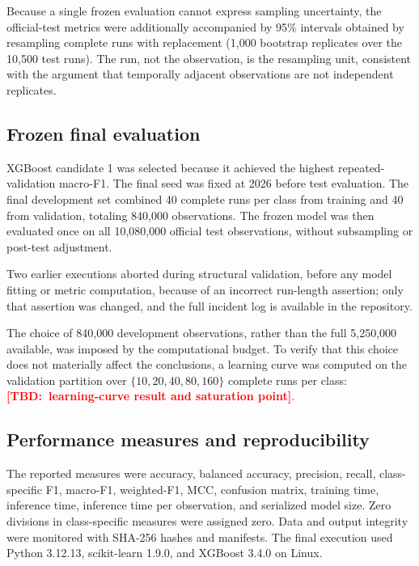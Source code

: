 \documentclass[10pt,twocolumn,a4paper]{article}
\newcommand{\TBD}[1]{\textcolor{red}{\textbf{[TBD:~#1]}}}
\begin{document}
Because a single frozen evaluation cannot express sampling uncertainty, the
official-test metrics were additionally accompanied by 95\% intervals obtained
by resampling complete runs with replacement (1{,}000 bootstrap replicates over
the 10{,}500 test runs). The run, not the observation, is the resampling unit,
consistent with the argument that temporally adjacent observations are not
independent replicates.

\subsection{Frozen final evaluation}

XGBoost candidate 1 was selected because it achieved the highest repeated-
validation macro-F1. The final seed was fixed at 2026 before test evaluation.
The final development set combined 40 complete runs per class from training and
40 from validation, totaling 840,000 observations. The frozen model was then
evaluated once on all 10,080,000 official test observations, without
subsampling or post-test adjustment.

Two earlier executions aborted during structural validation, before any model
fitting or metric computation, because of an incorrect run-length assertion;
only that assertion was changed, and the full incident log is available in the
repository.

The choice of 840,000 development observations, rather than the full 5,250,000
available, was imposed by the computational budget. To verify that this choice
does not materially affect the conclusions, a learning curve was computed on
the validation partition over $\{10,20,40,80,160\}$ complete runs per class:
\TBD{learning-curve result and saturation point}.

\subsection{Performance measures and reproducibility}
\label{sec:reproducibility}

The reported measures were accuracy, balanced accuracy, precision, recall,
class-specific F1, macro-F1, weighted-F1, MCC, confusion matrix, training time,
inference time, inference time per observation, and serialized model size.
Zero divisions in class-specific measures were assigned zero. Data and output
integrity were monitored with SHA-256 hashes and manifests. The final execution
used Python 3.12.13, scikit-learn 1.9.0, and XGBoost 3.4.0 on Linux.
\end{document}

